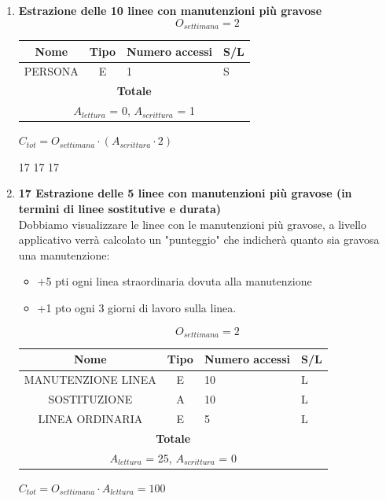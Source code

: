 \documentclass[12pt,a4paper]{report}
\begin{document}
\begin{enumerate}[label=\textbf{\arabic*)}]
    \item \textbf{Estrazione delle 10 linee con manutenzioni più gravose} \\
    \[ {O_{settimana} = 2} \]
    \begin{table}[H]
    \centering
    \begin{tabular}{|c|c|l|l|}
    \hline
    \textbf{Nome} & \textbf{Tipo} & \textbf{Numero accessi} & \textbf{S/L} \\
    \hline
    PERSONA & E & 1 & S \\
    \hline
    \multicolumn{4}{c}{\textbf{Totale}} \\    
    \multicolumn{4}{c}{${A_{lettura}}$ = 0, ${A_{scrittura}}$ = 1} \\
    \hline
    \end{tabular}
    \end{table}
    \begin{center}
    ${C_{tot} = {O_{settimana}}\cdot({A_{scrittura}}\cdot 2)}$
    \end{center}

17 17 17
\item \textbf{17 Estrazione delle 5 linee con manutenzioni
    più gravose (in termini di linee sostitutive e durata)} \\
    Dobbiamo visualizzare le linee con le manutenzioni più gravose, a livello applicativo verrà calcolato un "punteggio" che indicherà quanto sia gravosa una manutenzione:
    \begin{itemize}
        \item +5 pti ogni linea straordinaria dovuta alla manutenzione
        \item +1 pto ogni 3 giorni di lavoro sulla  linea.
    \end{itemize}
    \[ {O_{settimana} = 2} \]
    \begin{table}[H]
    \centering
    \begin{tabular}{|c|c|l|l|}
    \hline
    \textbf{Nome} & \textbf{Tipo} & \textbf{Numero accessi} & \textbf{S/L} \\
    \hline
    MANUTENZIONE LINEA & E & 10 & L \\ 
    \hline
    SOSTITUZIONE & A & 10 & L \\ 
    \hline
    LINEA ORDINARIA & E & 5 & L \\
    \hline
    \multicolumn{4}{c}{\textbf{Totale}} \\    
    \multicolumn{4}{c}{${A_{lettura}}$ = 25, ${A_{scrittura}}$ = 0} \\
    \hline
    \end{tabular}
    \end{table}
    \begin{center}
    ${C_{tot} = {O_{settimana}}\cdot {A_{lettura}} = 100}$
    \end{center}
    

\end{enumerate}
\end{document}

